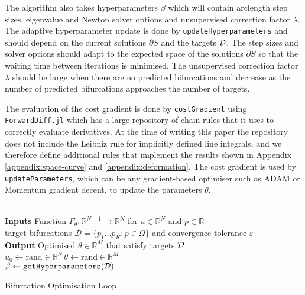 The algorithm also takes hyperparameters $\beta$ which will contain arclength step sizes, eigenvalue and Newton solver options and unsupervised correction factor $\lambda$. The adaptive hyperparameter update is done by \texttt{updateHyperparameters} and should depend on the current solutions $\partial S$ and the targets $\mathcal{D}$. The step sizes and solver options should adapt to the expected space of the solutions $\partial S$ so that the waiting time between iterations is minimised. The unsupervised correction factor $\lambda$ should be large when there are no predicted bifurcations and decrease as the number of predicted bifurcations approaches the number of targets.

The evaluation of the cost gradient is done by \texttt{costGradient} using \texttt{ForwardDiff.jl} \cite{Revels2016Forward-ModeJulia} which has a large repository of chain rules that it uses to correctly evaluate derivatives. At the time of writing this paper the repository does not include the Leibniz rule \cite{Flanders1973DifferentiationSign} for implicitly defined line integrals, and we therefore define additional rules that implement the results shown in Appendix \ref{appendix:space-curve} and \ref{appendix:deformation}. The cost gradient is used by \texttt{updateParameters}, which can be any gradient-based optimiser such as ADAM or Momentum gradient decent, to update the parameters $\theta$.
\\\\
\begin{algorithm*}[H]
\label{alg:optimisation-loop}
\SetAlgoLined
\textbf{Inputs} Function $F_{\theta}:\mathbb{R}^{N+1}\rightarrow\mathbb{R}^{N}$ for $u\in\mathbb{R}^N$ and $p\in\mathbb{R}$\\ target bifurcations $\mathcal{D}=\{p_1\dots p_K:p\in\Omega\}$ and convergence tolerance $\varepsilon$\\
\textbf{Output} Optimised $\theta\in\mathbb{R}^M$ that satisfy targets $\mathcal{D}$\\
$u_0\leftarrow\mathrm{rand}\in\mathbb{R}^{N}$\quad\,$\theta\leftarrow\mathrm{rand}\in\mathbb{R}^{M}$\\
$\beta\leftarrow\texttt{getHyperparameters}(\mathcal{D})$\\
\caption{Bifurcation Optimisation Loop}
\end{algorithm*}

